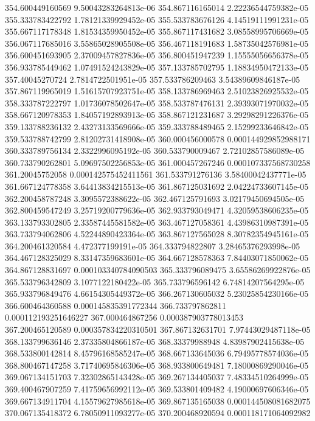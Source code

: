 {354.600449160569 9.50043283264813e-06
354.867116165014 2.22236544759382e-05
355.333783422792 1.78121339929452e-05
355.533783676126 4.14519111991231e-05
355.667117178348 1.81534359950452e-05
355.867117431682 3.08558995706669e-05
356.067117685016 3.55865028905508e-05
356.467118191683 1.58735042576981e-05
356.600451693905 2.37009457827836e-05
356.800451947239 1.15555056656378e-05
356.933785449462 1.07491524243829e-05
357.133785702795 1.18834950472133e-05
357.40045270724 2.7814722501951e-05
357.533786209463 3.54389609846187e-05
357.867119965019 1.51615707923751e-05
358.133786969463 2.51023826925532e-05
358.333787222797 1.01736078502647e-05
358.533787476131 2.39393071970032e-05
358.667120978353 1.84057192893913e-05
358.867121231687 3.29298291226376e-05
359.133788236132 2.43273133569666e-05
359.333788489465 2.15299233646842e-05
359.533788742799 2.81202731418908e-05
360.000456000578 0.000144929852988171
360.333789756134 2.3322996095192e-05
360.533790009467 2.72102857586089e-05
360.733790262801 5.09697502256853e-05
361.000457267246 0.000107337568730258
361.20045752058 0.000142575452411561
361.533791276136 3.58400042437771e-05
361.667124778358 3.64413834215513e-05
361.867125031692 2.04224733607145e-05
362.200458787248 3.3095572388622e-05
362.467125791693 3.02179450694505e-05
362.800459547249 3.25719200779636e-05
362.933793049471 4.32059538606235e-05
363.133793302805 2.33587445581582e-05
363.467127058361 4.43986310987391e-05
363.733794062806 4.52244890423364e-05
363.867127565028 8.30782354945161e-05
364.200461320584 4.472377199191e-05
364.333794822807 3.28465376293998e-05
364.467128325029 8.33147359683601e-05
364.667128578363 7.84403071850062e-05
364.867128831697 0.000103340784090503
365.333796089475 3.65586269922876e-05
365.533796342809 3.1077122180422e-05
365.733796596142 6.74814207564295e-05
365.933796849476 4.66154305449372e-05
366.267130605032 5.23025854230166e-05
366.600464360588 0.000145835391772344
366.733797862811 0.000112193251646227
367.000464867256 0.000387903778013453
367.200465120589 0.000357834220310501
367.867132631701 7.97443029487118e-05
368.133799636146 2.37335804866187e-05
368.33379988948 4.83987902415638e-05
368.533800142814 8.45796168585247e-05
368.667133645036 6.79495778574036e-05
368.800467147258 3.71740695846306e-05
368.933800649481 7.18000869290046e-05
369.067134151703 7.32302865143428e-05
369.267134405037 7.48334510264999e-05
369.400467907259 7.41759656992112e-05
369.533801409482 4.19000697606346e-05
369.667134911704 4.15579627985618e-05
369.867135165038 0.000144508081682075
370.067135418372 6.78050911093277e-05
370.200468920594 0.000118171064092982
}
